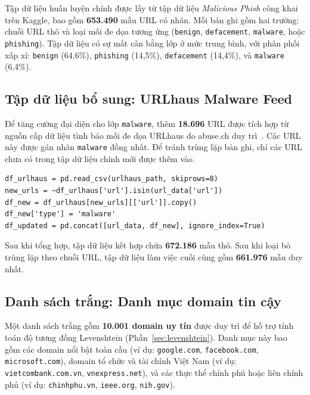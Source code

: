 \documentclass[a4paper,12pt]{article}
\begin{document}
Tập dữ liệu huấn luyện chính được lấy từ tập dữ liệu \textit{Malicious Phish} công khai trên Kaggle, bao gồm \textbf{653.490} mẫu URL có nhãn. Mỗi bản ghi gồm hai trường: chuỗi URL thô và loại mối đe dọa tương ứng (\texttt{benign}, \texttt{defacement}, \texttt{malware}, hoặc \texttt{phishing}). Tập dữ liệu có sự mất cân bằng lớp ở mức trung bình, với phân phối xấp xỉ: \texttt{benign} (64,6\%), \texttt{phishing} (14,5\%), \texttt{defacement} (14,4\%), và \texttt{malware} (6,4\%).

\subsection{Tập dữ liệu bổ sung: URLhaus Malware Feed}

Để tăng cường đại diện cho lớp \texttt{malware}, thêm \textbf{18.696} URL được tích hợp từ nguồn cấp dữ liệu tình báo mối đe dọa URLhaus do abuse.ch duy trì~\cite{urlhaus}. Các URL này được gán nhãn \texttt{malware} đồng nhất. Để tránh trùng lặp bản ghi, chỉ các URL chưa có trong tập dữ liệu chính mới được thêm vào.

\begin{lstlisting}[caption={Quy trình tổng hợp dữ liệu cho URL bổ sung từ URLhaus}]
df_urlhaus = pd.read_csv(urlhaus_path, skiprows=8)
new_urls = ~df_urlhaus['url'].isin(url_data['url'])
df_new = df_urlhaus[new_urls][['url']].copy()
df_new['type'] = 'malware'
df_updated = pd.concat([url_data, df_new], ignore_index=True)
\end{lstlisting}

Sau khi tổng hợp, tập dữ liệu kết hợp chứa \textbf{672.186} mẫu thô. Sau khi loại bỏ trùng lặp theo chuỗi URL, tập dữ liệu làm việc cuối cùng gồm \textbf{661.976} mẫu duy nhất.

\subsection{Danh sách trắng: Danh mục domain tin cậy}

Một danh sách trắng gồm \textbf{10.001 domain uy tín} được duy trì để hỗ trợ tính toán độ tương đồng Levenshtein (Phần~\ref{sec:levenshtein}). Danh mục này bao gồm các domain nổi bật toàn cầu (ví dụ: \texttt{google.com}, \texttt{facebook.com}, \texttt{microsoft.com}), domain tổ chức và tài chính Việt Nam (ví dụ: \texttt{vietcombank.com.vn}, \texttt{vnexpress.net}), và các thực thể chính phủ hoặc liên chính phủ (ví dụ: \texttt{chinhphu.vn}, \texttt{ieee.org}, \texttt{nih.gov}).

\end{document}
